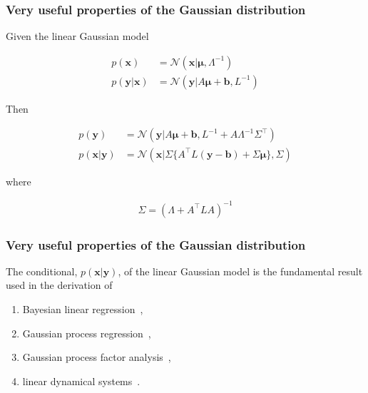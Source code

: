 \begin{frame}
    \frametitle{Very useful properties of the Gaussian distribution \citep{bishop06}}

	\small
	\begin{theorem}

		Given the linear Gaussian model

		\begin{align*}
			p(\mathbf{x})&=\mathcal{N}(\mathbf{x}|\boldsymbol{\mu},\Lambda^{-1})\\
			p(\mathbf{y}|\mathbf{x})&=\mathcal{N}(\mathbf{y}|A\boldsymbol{\mu}+\mathbf{b},L^{-1})
		\end{align*}

		Then

		\begin{align*}
			p(\mathbf{y})&=\mathcal{N}(\mathbf{y}|A\boldsymbol{\mu}+\mathbf{b},L^{-1}+A\Lambda^{-1}\Sigma^\intercal)\\
			p(\mathbf{x}|\mathbf{y})&=\mathcal{N}(\mathbf{x}|\Sigma\{A^\intercal L(\mathbf{y}-\mathbf{b})+\Sigma\boldsymbol{\mu}\},\Sigma)
		\end{align*}

		where

		\begin{align*}
			\Sigma=(\Lambda+A^\intercal LA)^{-1}
		\end{align*}

	\end{theorem}
	\normalsize
\end{frame}

\begin{frame}
    \frametitle{Very useful properties of the Gaussian distribution \citep{bishop06}}

	The conditional, $p(\mathbf{x}|\mathbf{y})$, of the linear Gaussian model is the fundamental result used in the derivation of

	\begin{enumerate}

		\item Bayesian linear regression~\citep{bishop06},

		\item Gaussian process regression~\citep{williamsAndRasmussen06},

		\item Gaussian process factor analysis~\citep{yuEtAl09},

		\item linear dynamical systems~\citep{durbinAndKoopman12}.

	\end{enumerate}

\end{frame}

